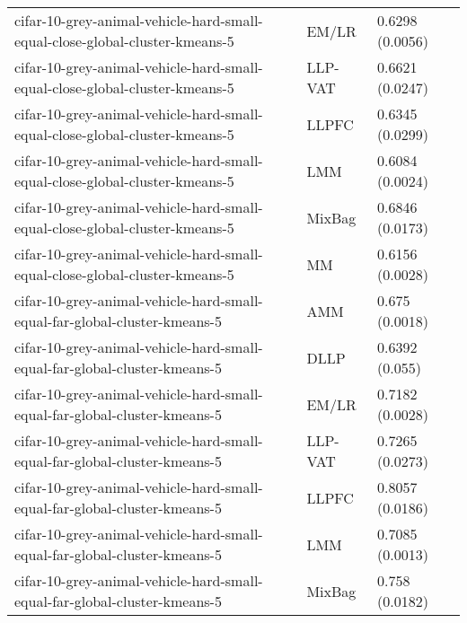 \begin{longtable}{lll}
                                  cifar-10-grey-animal-vehicle-hard-small-equal-close-global-cluster-kmeans-5 &     EM/LR &                           0.6298 (0.0056) \\
                                  cifar-10-grey-animal-vehicle-hard-small-equal-close-global-cluster-kmeans-5 &   LLP-VAT &                           0.6621 (0.0247) \\
                                  cifar-10-grey-animal-vehicle-hard-small-equal-close-global-cluster-kmeans-5 &     LLPFC &                           0.6345 (0.0299) \\
                                  cifar-10-grey-animal-vehicle-hard-small-equal-close-global-cluster-kmeans-5 &       LMM &                           0.6084 (0.0024) \\
                                  cifar-10-grey-animal-vehicle-hard-small-equal-close-global-cluster-kmeans-5 &    MixBag &                           0.6846 (0.0173) \\
                                  cifar-10-grey-animal-vehicle-hard-small-equal-close-global-cluster-kmeans-5 &        MM &                           0.6156 (0.0028) \\
                                    cifar-10-grey-animal-vehicle-hard-small-equal-far-global-cluster-kmeans-5 &       AMM &                            0.675 (0.0018) \\
                                    cifar-10-grey-animal-vehicle-hard-small-equal-far-global-cluster-kmeans-5 &      DLLP &                            0.6392 (0.055) \\
                                    cifar-10-grey-animal-vehicle-hard-small-equal-far-global-cluster-kmeans-5 &     EM/LR &                           0.7182 (0.0028) \\
                                    cifar-10-grey-animal-vehicle-hard-small-equal-far-global-cluster-kmeans-5 &   LLP-VAT &                           0.7265 (0.0273) \\
                                    cifar-10-grey-animal-vehicle-hard-small-equal-far-global-cluster-kmeans-5 &     LLPFC &                           0.8057 (0.0186) \\
                                    cifar-10-grey-animal-vehicle-hard-small-equal-far-global-cluster-kmeans-5 &       LMM &                           0.7085 (0.0013) \\
                                    cifar-10-grey-animal-vehicle-hard-small-equal-far-global-cluster-kmeans-5 &    MixBag &                            0.758 (0.0182) \\

\end{longtable}

